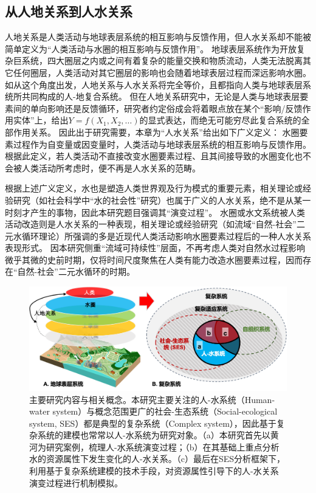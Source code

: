 \subsection{从人地关系到人水关系}

人地关系是人类活动与地球表层系统的相互影响与反馈作用\cite{wu1991,li2016d}，但人水关系却不能被简单定义为“人类活动与水圈的相互影响与反馈作用”。
地球表层系统作为开放复杂巨系统，四大圈层之内或之间有着复杂的能量交换和物质流动，人类无法脱离其它任何圈层，人类活动对其它圈层的影响也会随着地球表层过程而深远影响水圈。
如从这个角度出发，人地关系与人水关系将完全等价，且都指向人类与地球表层系统所共同构成的人-地复合系统。
但在人地关系研究中，无论是人类与地球表层要素间的单向影响还是反馈循环，研究者约定俗成会将着眼点放在某个“影响/反馈作用实体”上，给出$Y = f(X_1, X_2, \dots)$的显式表达，而绝无可能穷尽此复合系统的全部作用关系。
因此出于研究需要，本章为“人水关系”给出如下广义定义：
水圈要素过程作为自变量或因变量时，人类活动与地球表层系统的相互影响与反馈作用。
根据此定义，若人类活动不直接改变水圈要素过程、且其间接导致的水圈变化也不会被人类活动所考虑时，便不再是人水关系的范畴。

根据上述广义定义，水也是塑造人类世界观及行为模式的重要元素，相关理论或经验研究（如社会科学中“水的社会性”研究）也属于广义的人水关系，绝不是从某一时刻才产生的事物，因此本研究题目强调其“演变过程”。
水圈或水文系统被人类活动改造则是人水关系的一种表现，相关理论或经验研究（如流域“自然-社会”二元水循环理论\cite{wang2006, wang2016}）所强调的多是近现代人类活动影响水圈要素过程后的一种人水关系表现形式。
因本研究侧重“流域可持续性”层面，不再考虑人类对自然水过程影响微乎其微的史前时期，仅将时间尺度聚焦在人类有能力改造水圈要素过程，因而存在“自然-社会”二元水循环的时期。

\begin{figure}[htb] %
    \centering
    \includegraphics[width=\textwidth]{img/ch2/ch2_definitions.png}
    \caption[主要研究内容与相关概念]{主要研究内容与相关概念。本研究主要关注的人-水系统（Human-water system）与概念范围更广的社会-生态系统（Social-ecological system, SES）都是典型的复杂系统（Complex system），因此基于复杂系统的建模也常常以人-水系统为研究对象。（a）本研究首先以黄河为研究案例，梳理人-水系统演变过程；（b）在其基础上重点分析水的资源属性下发生变化的人-水关系。（c）最后在SES分析框架下，利用基于复杂系统建模的技术手段，对资源属性引导下的人-水关系演变过程进行机制模拟。}\label{ch2:fig:definitions}
\end{figure}

